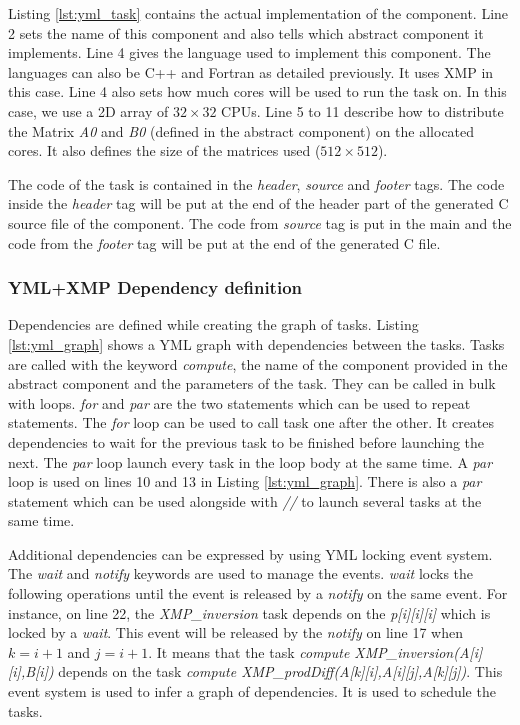 Listing \ref{lst:yml_task} contains the actual implementation of the component.
Line 2 sets the name of this component and also tells which abstract component it implements.
Line 4 gives the language used to implement this component.
The languages can also be C++ and Fortran as detailed previously.
It uses XMP in this case.
Line 4 also sets how much cores will be used to run the task on.
In this case, we use a 2D array of $32 \times 32$ CPUs.
Line 5 to 11 describe how to distribute the Matrix \textit{A0} and \textit{B0} (defined in the abstract component) on the allocated cores.
It also defines the size of the matrices used ($512 \times 512$).

The code of the task is contained in the \textit{header}, \textit{source} and \textit{footer} tags.
The code inside the \textit{header} tag will be put at the end of the header part of the generated C source file of the component.
The code from \textit{source} tag is put in the main and the code from the \textit{footer} tag will be put at the end of the generated C file.

\subsubsection{YML+XMP Dependency definition}
Dependencies are defined while creating the graph of tasks.
Listing \ref{lst:yml_graph} shows a YML graph with dependencies between the tasks.
Tasks are called with the keyword \textit{compute}, the name of the component provided in the abstract component and the parameters of the task.
They can be called in bulk with loops.
\textit{for} and \textit{par} are the two statements which can be used to repeat statements.
The \textit{for} loop can be used to call task one after the other.
It creates dependencies to wait for the previous task to be finished before launching the next.
The \textit{par} loop launch every task in the loop body at the same time.
A \textit{par} loop is used on lines 10 and 13 in Listing \ref{lst:yml_graph}.
There is also a \textit{par} statement which can be used alongside with \textit{//} to launch several tasks at the same time.

Additional dependencies can be expressed by using YML locking event system.
The \textit{wait} and \textit{notify} keywords are used to manage the events.
\textit{wait} locks the following operations until the event is released by a \textit{notify} on the same event.
For instance, on line 22, the \textit{XMP\_inversion} task depends on the \textit{p[i][i][i]} which is locked by a \textit{wait}.
This event will be released by the \textit{notify} on line 17 when $k = i + 1$ and $j= i + 1$.
It means that the task \textit{compute XMP\_inversion(A[i][i],B[i])} depends on the task \textit{compute XMP\_prodDiff(A[k][i],A[i][j],A[k][j])}.
This event system is used to infer a graph of dependencies.
It is used to schedule the tasks.

